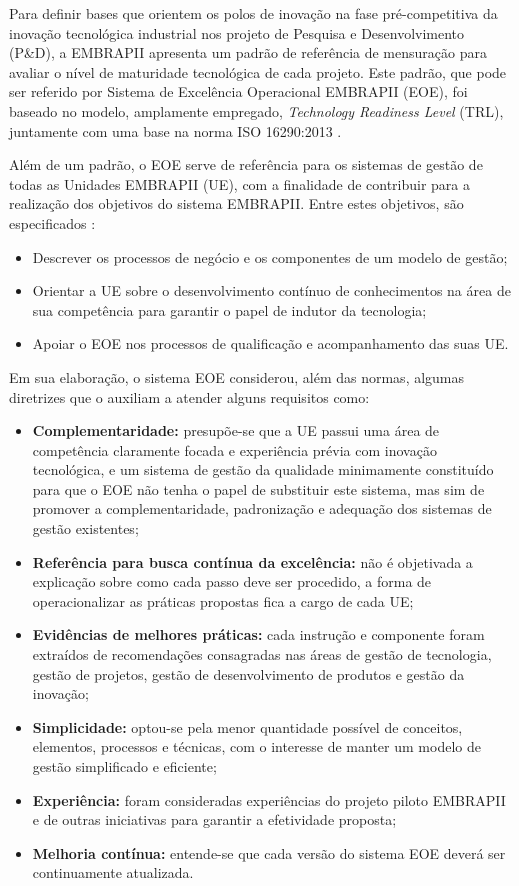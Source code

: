   Para definir bases que orientem os polos de inovação na fase pré-competitiva da inovação tecnológica industrial nos projeto de Pesquisa e Desenvolvimento (P\&D), a EMBRAPII apresenta um padrão de referência de mensuração para avaliar o nível de maturidade tecnológica de cada projeto. Este padrão, que pode ser referido por Sistema de Excelência Operacional EMBRAPII (EOE), foi baseado no modelo, amplamente empregado, \textit{Technology Readiness Level} (TRL), juntamente com uma base na norma ISO 16290:2013 \cite{embrapii_manual}.

  Além de um padrão, o EOE serve de referência para os sistemas de gestão de todas as Unidades EMBRAPII (UE), com a finalidade de contribuir para a realização dos objetivos do sistema EMBRAPII. Entre estes objetivos, são especificados \cite{embrapii_sistema}:

  \begin{itemize}
    \item Descrever os processos de negócio e os componentes de um modelo de gestão;
    \item Orientar a UE sobre o desenvolvimento contínuo de conhecimentos na área de sua competência para garantir o papel de indutor da tecnologia;
    \item Apoiar o EOE nos processos de qualificação e acompanhamento das suas UE.
  \end{itemize}

  Em sua elaboração, o sistema EOE considerou, além das normas, algumas diretrizes que o auxiliam a atender alguns requisitos como:

  \begin{itemize}
    \item \textbf{Complementaridade:} presupõe-se que a UE passui uma área de competência claramente focada e experiência prévia com inovação tecnológica, e um sistema de gestão da qualidade minimamente constituído para que o EOE não tenha o papel de substituir este sistema, mas sim de promover a complementaridade, padronização e adequação dos sistemas de gestão existentes;
    \item \textbf{Referência para busca contínua da excelência:} não é objetivada a explicação sobre como cada passo deve ser procedido, a forma de operacionalizar as práticas propostas fica a cargo de cada UE;
    \item \textbf{Evidências de melhores práticas:} cada instrução e componente foram extraídos de recomendações consagradas nas áreas de gestão de tecnologia, gestão de projetos, gestão de desenvolvimento de produtos e gestão da inovação;
    \item \textbf{Simplicidade:} optou-se pela menor quantidade possível de conceitos, elementos, processos e técnicas, com o interesse de manter um modelo de gestão simplificado e eficiente;
    \item \textbf{Experiência:} foram consideradas experiências do projeto piloto EMBRAPII e de outras iniciativas para garantir a efetividade proposta;
    \item \textbf{Melhoria contínua:} entende-se que cada versão do sistema EOE deverá ser continuamente atualizada.
  \end{itemize}


